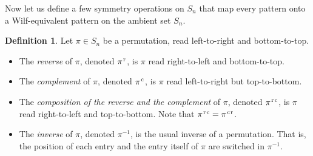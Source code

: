 \documentclass[
final
]{dmtcs-episciences}
\theoremstyle{definition}
\newtheorem{definition}[theorem]{Definition}
\newtheorem{notation}[theorem]{Notation}
\theoremstyle{remark}
\begin{document}
Now let us define a few symmetry operations on $S_n$ that map every pattern onto a Wilf-equivalent pattern on the ambient set $S_n$.

\begin{definition}
Let $\pi \in S_n$ be a permutation, read left-to-right and bottom-to-top.

\begin{itemize}
\item The \emph{reverse} of $\pi$, denoted $\pi^\text{\hspace{0.01in}r}$, is $\pi$ read right-to-left and bottom-to-top.
\item The \emph{complement} of $\pi$, denoted $\pi^\text{\hspace{0.01in}c}$, is $\pi$ read left-to-right but top-to-bottom.
\item The \emph{composition of the reverse and the complement} of $\pi$, denoted  $\pi^\text{\hspace{0.01in}r\hspace{0.01in}c}$, is $\pi$ read right-to-left and top-to-bottom. Note that $\pi^\text{\hspace{0.01in}r\hspace{0.01in}c} = \pi^\text{\hspace{0.01in}c\hspace{0.01in}r}$.
\item The \emph{inverse} of $\pi$, denoted $\pi^{-1}$, is the usual inverse of a permutation.  That is, the position of each entry and the entry itself of $\pi$ are switched in $\pi^{-1}$.
\end{itemize}

\end{definition}

%
\end{document}
